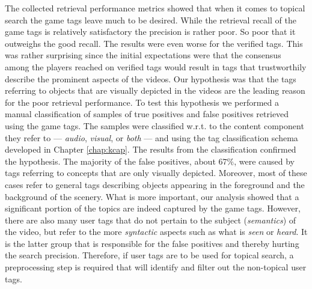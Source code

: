 The collected retrieval performance metrics showed that when it comes to topical search the game tags leave much to be desired. While the retrieval recall of the game tags is relatively satisfactory the precision is rather poor. So poor that it outweighs the good recall. The results were even worse for the verified tags. This was rather surprising since the initial expectations were that the consensus among the players reached on verified tags would result in tags that trustworthily describe the prominent aspects of the videos. Our hypothesis was that the tags referring to objects that are visually depicted in the videos are the leading reason for the poor retrieval performance. To test this hypothesis we performed a manual classification of samples of true positives and false positives retrieved using the game tags. The samples were classified w.r.t. to the content component they refer to --- \textit{audio}, \textit{visual}, or \textit{both} --- and using the tag classification schema developed in Chapter \ref{chap:kcap}. The results from the classification confirmed the hypothesis. The majority of the false positives, about $67\%$, were caused by tags referring to concepts that are only visually depicted. Moreover, most of these cases refer to general tags describing objects  appearing in the foreground and the background of the scenery. What is more important, our analysis showed that a significant portion of the topics are indeed captured by the game tags. However, there are
also many user tags that do not pertain to the subject (\textit{semantics}) of the video, but refer to the more \textit{syntactic} aspects such as what is \textit{seen} or \textit{heard}. It is the latter group that is responsible for the false positives and thereby hurting the search precision. Therefore, if user tags are to be used for topical search, a preprocessing step is required that will identify and filter out the non-topical user tags.

